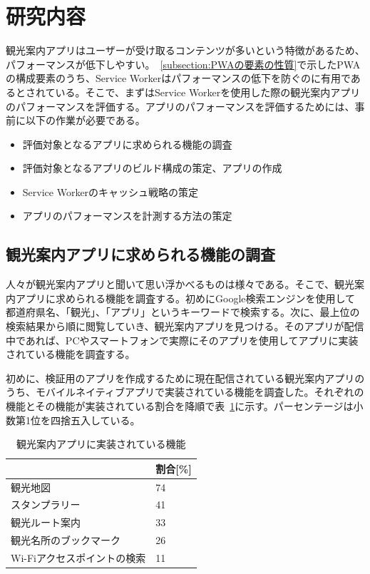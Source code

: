 \section{研究内容}
\label{section:研究内容}
観光案内アプリはユーザーが受け取るコンテンツが多いという特徴があるため、パフォーマンスが低下しやすい。~\autoref{subsection:PWAの要素の性質}で示したPWAの構成要素のうち、Service Workerはパフォーマンスの低下を防ぐのに有用であるとされている。そこで、まずはService Workerを使用した際の観光案内アプリのパフォーマンスを評価する。アプリのパフォーマンスを評価するためには、事前に以下の作業が必要である。
\begin{itemize}
    \item 評価対象となるアプリに求められる機能の調査
    \item 評価対象となるアプリのビルド構成の策定、アプリの作成
    \item Service Workerのキャッシュ戦略の策定
    \item アプリのパフォーマンスを計測する方法の策定
\end{itemize}
\subsection{観光案内アプリに求められる機能の調査}
\label{subsubsection:観光案内アプリに求められる機能の調査}
人々が観光案内アプリと聞いて思い浮かべるものは様々である。そこで、観光案内アプリに求められる機能を調査する。初めにGoogle検索エンジンを使用して都道府県名、「観光」、「アプリ」というキーワードで検索する。次に、最上位の検索結果から順に閲覧していき、観光案内アプリを見つける。そのアプリが配信中であれば、PCやスマートフォンで実際にそのアプリを使用してアプリに実装されている機能を調査する。

初めに、検証用のアプリを作成するために現在配信されている観光案内アプリのうち、モバイルネイティブアプリで実装されている機能を調査した。それぞれの機能とその機能が実装されている割合を降順で表~\ref{table:観光案内アプリに実装されている機能}に示す。パーセンテージは小数第1位を四捨五入している。
\begin{table}
  \caption{観光案内アプリに実装されている機能}
  \label{table:観光案内アプリに実装されている機能}
  \centering
  \begin{tabular}{|p{15em}|p{10em}|}
    \hline
    & 割合[\%] \\ \hline
    観光地図 & 74 \\ \hline
    スタンプラリー & 41\\ \hline
    観光ルート案内 & 33\\ \hline
    観光名所のブックマーク & 26\\ \hline
    Wi-Fiアクセスポイントの検索 & 11 \\ \hline
  \end{tabular}
\end{table}

